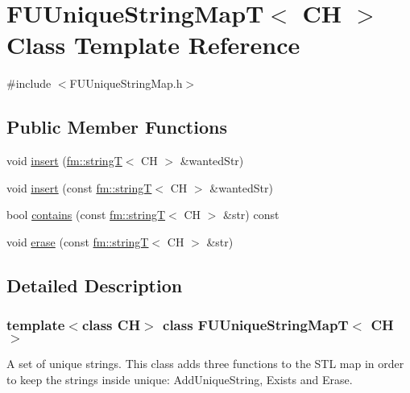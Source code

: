 \hypertarget{classFUUniqueStringMapT}{
\section{FUUniqueStringMapT$<$ CH $>$ Class Template Reference}
\label{classFUUniqueStringMapT}
}


{\ttfamily \#include $<$FUUniqueStringMap.h$>$}

\subsection*{Public Member Functions}
\begin{DoxyCompactItemize}
\item 
void \hyperlink{classFUUniqueStringMapT_abdfdcbeda8a3788be1ec437a83c1dde5}{insert} (\hyperlink{classfm_1_1stringT}{fm::stringT}$<$ CH $>$ \&wantedStr)
\item 
void \hyperlink{classFUUniqueStringMapT_ab68661fbfa6c780112fb8c621bf57187}{insert} (const \hyperlink{classfm_1_1stringT}{fm::stringT}$<$ CH $>$ \&wantedStr)
\item 
bool \hyperlink{classFUUniqueStringMapT_ac433739a6f7850cdcf306f71374ffe75}{contains} (const \hyperlink{classfm_1_1stringT}{fm::stringT}$<$ CH $>$ \&str) const 
\item 
void \hyperlink{classFUUniqueStringMapT_a86514dd7886d28016eedcd6189f45ca4}{erase} (const \hyperlink{classfm_1_1stringT}{fm::stringT}$<$ CH $>$ \&str)
\end{DoxyCompactItemize}


\subsection{Detailed Description}
\subsubsection*{template$<$class CH$>$ class FUUniqueStringMapT$<$ CH $>$}

A set of unique strings. This class adds three functions to the STL map in order to keep the strings inside unique: AddUniqueString, Exists and Erase. 

